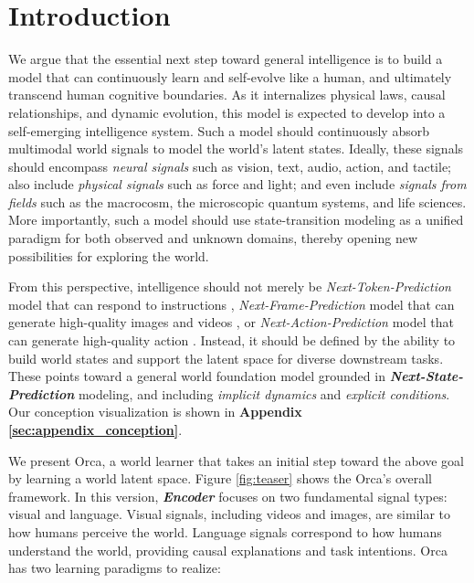 

\section{Introduction}\label{sec:intro}



We argue that the essential next step toward general intelligence is to build a model that can continuously learn and self-evolve like a human, and ultimately transcend human cognitive boundaries. As it internalizes physical laws, causal relationships, and dynamic evolution, this model is expected to develop into a self-emerging intelligence system. Such a model should continuously absorb multimodal world signals to model the world's latent states. Ideally, these signals should encompass \textit{neural signals} such as vision, text, audio, action, and tactile; also include \textit{physical signals} such as force and light; and even include \textit{signals from fields} such as the macrocosm, the microscopic quantum systems, and life sciences.
More importantly, such a model should use state-transition modeling as a unified paradigm for both observed and unknown domains, thereby opening new possibilities for exploring the world.



From this perspective, intelligence should not merely be \textit{Next-Token-Prediction} model that can respond to instructions \citep{DeepSeek-V4, qwen36_35b_a3b, Emu3, GPT54}, \textit{Next-Frame-Prediction} model that can generate high-quality images and videos \citep{nanobananapro, ChatGPT-Images-2.0, seedance2.0}, or \textit{Next-Action-Prediction} model that can generate high-quality action \citep{pi0.7, DreamZero, GR00TN1.7}. Instead, it should be defined by the ability to build world states and support the latent space for diverse downstream tasks. These points toward a general world foundation model grounded in \textit{\textbf{Next-State-Prediction}} modeling, and including \textit{implicit dynamics} and \textit{explicit conditions}.
Our conception visualization is shown in \textbf{Appendix \ref{sec:appendix_conception}}.

We present Orca, a world learner that takes an initial step toward the above goal by learning a world latent space. Figure \ref{fig:teaser} shows the Orca's overall framework. In this version, \textbf{\textit{Encoder}} focuses on two fundamental signal types: visual and language. Visual signals, including videos and images, are similar to how humans perceive the world. Language signals correspond to how humans understand the world, providing causal explanations and task intentions. Orca has two learning paradigms to realize:

